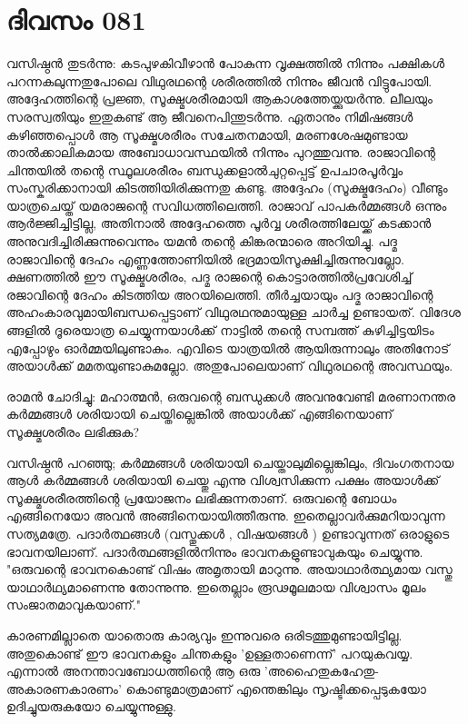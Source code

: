  
\section{ദിവസം 081}


വസിഷ്ഠന്‍ തുടര്‍ന്നു: കടപുഴകിവീഴാന്‍ പോകുന്ന വൃക്ഷത്തില്‍ നിന്നും പക്ഷികള്‍ പറന്നകലുന്നതുപോലെ വിഥുരഥന്റെ ശരീരത്തില്‍ നിന്നും ജീവന്‍ വിട്ടുപോയി. അദ്ദേഹത്തിന്റെ പ്രജ്ഞ, സൂക്ഷ്മശരീരമായി ആകാശത്തേയ്ക്കുയര്‍ന്നു. ലീലയും സരസ്വതിയും ഇതുകണ്ട്‌ ആ ജീവനെപിന്തുടര്‍ന്നു. ഏതാനും നിമിഷങ്ങള്‍ കഴിഞ്ഞപ്പൊള്‍ ആ സൂക്ഷ്മശരീരം സചേതനമായി, മരണശേഷമുണ്ടായ താല്‍ക്കാലികമായ അബോധാവസ്ഥയില്‍ നിന്നും  പുറത്തുവന്നു. രാജാവിന്റെ ചിന്തയില്‍ തന്റെ സ്ഥൂലശരീരം ബന്ധുക്കളാല്‍ചുറ്റപ്പെട്ട്‌ ഉപചാരപൂര്‍വ്വം സംസ്കരിക്കാനായി കിടത്തിയിരിക്കുന്നതു കണ്ടു. അദ്ദേഹം (സൂക്ഷ്മദേഹം) വീണ്ടും യാത്രചെയ്ത്‌ യമരാജന്റെ സവിധത്തിലെത്തി. രാജാവ്‌ പാപകര്‍മ്മങ്ങള്‍ ഒന്നും ആര്‍ജ്ജിച്ചിട്ടില്ല,  അതിനാല്‍ അദ്ദേഹത്തെ പൂര്‍വ്വ ശരീരത്തിലേയ്ക്ക്‌ കടക്കാന്‍ അനുവദിച്ചിരിക്കുന്നുവെന്നും യമന്‍ തന്റെ കിങ്കരന്മാരെ അറിയിച്ചു. പദ്മ രാജാവിന്റെ ദേഹം എണ്ണത്തോണിയില്‍ ഭദ്രമായിസൂക്ഷിച്ചിരുന്നുവല്ലോ. ക്ഷണത്തില്‍ ഈ സൂക്ഷ്മശരീരം, പദ്മ രാജന്റെ കൊട്ടാരത്തില്‍പ്രവേശിച്ച്‌ രജാവിന്റെ ദേഹം കിടത്തിയ   അറയിലെത്തി. തീര്‍ച്ചയായും പദ്മ രാജാവിന്റെ അഹംകാരവുമായിബന്ധപ്പെട്ടാണ്‌ വിഥുരഥനുമായുള്ള ചാര്‍ച്ച ഉണ്ടായത്‌. വിദേശ  ങ്ങളില്‍ ദൂരെയാത്ര ചെയ്യുന്നയാള്‍ക്ക് നാട്ടില്‍ തന്റെ സമ്പത്ത്  കുഴിച്ചിട്ടയിടം എപ്പോഴും ഓര്‍മ്മയിലുണ്ടാകും.   എവിടെ യാത്രയില്‍  ആയിരുന്നാലും അതിനോട്‌ അയാള്‍ക്ക്  മമതയുണ്ടാകുമല്ലോ. അതുപോലെയാണ്‌ വിഥുരഥന്റെ അവസ്ഥയും. 

രാമന്‍ ചോദിച്ചു: മഹാത്മന്‍, ഒരുവന്റെ ബന്ധുക്കള്‍ അവനുവേണ്ടി മരണാനന്തര കര്‍മ്മങ്ങള്‍ ശരിയായി ചെയ്തില്ലെങ്കില്‍ അയാള്‍ക്ക്‌ എങ്ങിനെയാണ്‌ സൂക്ഷ്മശരീരം ലഭിക്കുക?

വസിഷ്ഠന്‍ പറഞ്ഞു; കര്‍മ്മങ്ങള്‍ ശരിയായി ചെയ്താലുമില്ലെങ്കിലും, ദിവംഗതനായ ആള്‍ കര്‍മ്മങ്ങള്‍ ശരിയായി ചെയ്തു എന്നു വിശ്വസിക്കുന്ന പക്ഷം അയാള്‍ക്ക്‌ സൂക്ഷ്മശരീരത്തിന്റെ പ്രയോജനം ലഭിക്കുന്നതാണ്‌. ഒരുവന്റെ ബോധം എങ്ങിനെയോ അവന്‍ അങ്ങിനെയായിത്തീരുന്നു. ഇതെല്ലാവര്‍ക്കുമറിയാവുന്ന സത്യമത്രേ. പദാര്‍ത്ഥങ്ങള്‍ (വസ്തുക്കള്‍ , വിഷയങ്ങള്‍ ) ഉണ്ടാവുന്നത്‌ ഒരാളുടെ ഭാവനയിലാണ്‌. പദാര്‍ത്ഥങ്ങളില്‍നിന്നും ഭാവനകളുണ്ടാവുകയും ചെയ്യുന്നു. "ഒരുവന്റെ ഭാവനകൊണ്ട്‌ വിഷം അമൃതായി മാറുന്നു. അയാഥാര്‍ത്ഥ്യമായ വസ്തു യാഥാര്‍ഥ്യമാണെന്നു തോന്നുന്നു. ഇതെല്ലാം രൂഢമൂലമായ വിശ്വാസം മൂലം സംജാതമാവുകയാണ്‌."

കാരണമില്ലാതെ യാതൊരു കാര്യവും ഇന്നുവരെ ഒരിടത്തുമുണ്ടായിട്ടില്ല. അതുകൊണ്ട്‌ ഈ ഭാവനകളും ചിന്തകളും 'ഉള്ളതാണെന്ന്' പറയുകവയ്യ. എന്നാല്‍ അനന്താവബോധത്തിന്റെ ആ ഒരു 'അഹൈതുകഹേതു- അകാരണകാരണം' കൊണ്ടുമാത്രമാണ്‌ എന്തെങ്കിലും സൃഷ്ടിക്കപ്പെടുകയോ ഉദിച്ചുയരുകയോ ചെയ്യുന്നുള്ളു.


